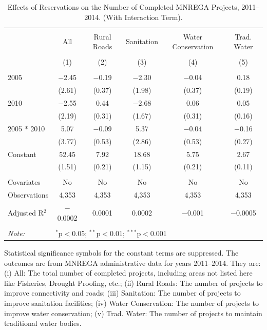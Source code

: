 \begin{table}[!htbp]
\centering
\begin{threeparttable}

  \caption{Effects of Reservations on the Number of Completed MNREGA Projects, 2011--2014. (With Interaction Term).} 
  \label{main_mnrega_interaction} 
\scriptsize 
\begin{tabular}{@{\extracolsep{0pt}}lccccc} 
\\[-1.8ex]\hline 
\hline \\[-1.8ex] 
 & All & Rural Roads & Sanitation & Water Conservation & Trad. Water \\ 
\\[-1.8ex] & (1) & (2) & (3) & (4) & (5)\\ 
\hline \\[-1.8ex] 
 2005 & $-$2.45 & $-$0.19 & $-$2.30 & $-$0.04 & 0.18 \\ 
  & (2.61) & (0.37) & (1.98) & (0.37) & (0.19) \\ 
  2010 & $-$2.55 & 0.44 & $-$2.68 & 0.06 & 0.05 \\ 
  & (2.19) & (0.31) & (1.67) & (0.31) & (0.16) \\ 
  2005 * 2010 & 5.07 & $-$0.09 & 5.37 & $-$0.04 & $-$0.16 \\ 
  & (3.77) & (0.53) & (2.86) & (0.53) & (0.27) \\ 
  Constant & 52.45 & 7.92 & 18.68 & 5.75 & 2.67 \\ 
  & (1.51) & (0.21) & (1.15) & (0.21) & (0.11) \\ 
 \hline \\[-1.8ex] 
Covariates & No & No & No & No & No \\ 
Observations & 4,353 & 4,353 & 4,353 & 4,353 & 4,353 \\ 
Adjusted R$^{2}$ & $-$0.0002 & 0.0001 & 0.0002 & $-$0.001 & $-$0.0005 \\ 
\hline 
\hline \\[-1.8ex] 
\textit{Note:}  & \multicolumn{5}{l}{$^{*}$p$<$0.05; $^{**}$p$<$0.01; $^{***}$p$<$0.001} \\ 
\end{tabular} 
\begin{tablenotes}[flushleft]
\scriptsize
\item[] Statistical significance symbols for the constant terms are suppressed. The outcomes are from MNREGA administrative data for years 2011--2014. They are: 
(i) All: The total number of completed projects, including areas not listed here like Fisheries, Drought Proofing, etc.;
(ii) Rural Roads: The number of projects to improve connectivity and roads;
(iii) Sanitation: The number of projects to improve sanitation facilities;
(iv) Water Conservation: The number of projects to improve water conservation;
(v) Trad. Water: The number of projects to maintain traditional water bodies.
\end{tablenotes}
\end{threeparttable}
\end{table}
